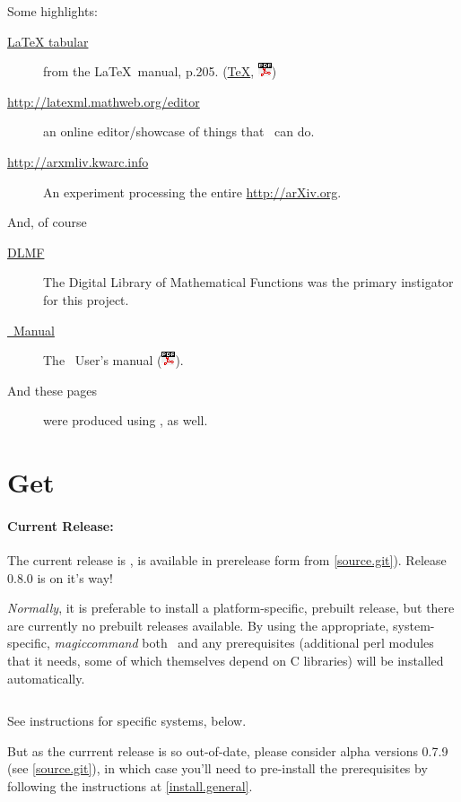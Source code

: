 \documentclass{article}
\newcommand{\PDFIcon}{\includegraphics{pdf}}
\begin{document}
Some highlights:
\begin{description}
\item[\href{examples/tabular/tabular.html}{LaTeX tabular}]
    from the \LaTeX\ manual, p.205.
    (\href{examples/tabular/tabular.tex}{\TeX},
     \href{examples/tabular/tabular.pdf}{\PDFIcon})
\item[\url{http://latexml.mathweb.org/editor}] an online editor/showcase
  of things that \LaTeXML\ can do.
\item[\url{http://arxmliv.kwarc.info}] An experiment processing
  the entire \url{http://arXiv.org}.
\end{description}
And, of course
\begin{description}
\item[\href{http://dlmf.nist.gov/}{DLMF}]
   The Digital Library of Mathematical Functions was the
   primary instigator for this project.
\item[\href{manual/}{\LaTeXML\ Manual}]
   The \LaTeXML\ User's manual (\href{manual.pdf}{\PDFIcon}).
\item[And these pages] were produced using \LaTeXML, as well.
\end{description}

\section{Get \LaTeXML}\label{get}
\paragraph{Current Release:}\label{download.current}
The current release is ,
is available in prerelease form from  \ref{source.git}).
Release 0.8.0 is on it's way!

\emph{Normally}, it is preferable to install a platform-specific, prebuilt release,
but there are currently no prebuilt releases available.
By using the appropriate, system-specific, \textit{magiccommand}
both \LaTeXML\ and any prerequisites
(additional perl modules that it needs, some of which themselves depend on C libraries)
will be installed automatically.
\begin{lstlisting}[style=shell]
%magiccommand% LaTeXML
\end{lstlisting}
See instructions for specific systems, below.

But as the currrent release is so out-of-date,
please consider alpha versions 0.7.9 (see \ref{source.git}),
in which case you'll need to pre-install the prerequisites
by following the instructions at \ref{install.general}.
\end{document}
